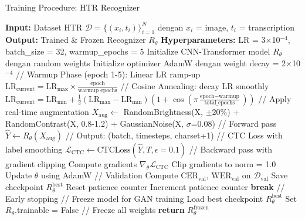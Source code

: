 \documentclass[12pt,a4paper]{article}
\begin{document}
\begin{algorithm}[H]
\caption{Training Procedure: HTR Recognizer}
\label{alg:recognizer-training}
\small
\begin{algorithmic}[1]
\STATE \textbf{Input:} Dataset HTR $\mathcal{D} = \{(x_i, t_i)\}_{i=1}^N$ dengan $x_i$ = image, $t_i$ = transcription
\STATE \textbf{Output:} Trained \& Frozen Recognizer $R_{\theta}$
\STATE \textbf{Hyperparameters:} LR = 3×10$^{-4}$, batch\_size = 32, warmup\_epochs = 5
\STATE
\STATE Initialize CNN-Transformer model $R_{\theta}$ dengan random weights
\STATE Initialize optimizer AdamW dengan weight decay = 2×10$^{-4}$
\STATE
{}
    \STATE // Warmup Phase (epoch 1-5): Linear LR ramp-up
        \STATE $\text{LR}_{\text{current}} = \text{LR}_{\text{max}} \times \frac{\text{epoch}}{\text{warmup\_epochs}}$
    \ELSE
        \STATE // Cosine Annealing: decay LR smoothly
        \STATE $\text{LR}_{\text{current}} = \text{LR}_{\text{min}} + \frac{1}{2}(\text{LR}_{\text{max}} - \text{LR}_{\text{min}})(1 + \cos(\pi \frac{\text{epoch} - \text{warmup}}{\text{total\_epochs}}))$
    \ENDIF
    \STATE
        \STATE // Apply real-time augmentation
        \STATE $X_{\text{aug}} \gets$ RandomBrightness(X, $\pm$20\%) + RandomContrast(X, 0.8-1.2) + GaussianNoise(X, $\sigma$=0.08)
        \STATE
        \STATE // Forward pass
        \STATE $\hat{Y} \gets R_{\theta}(X_{\text{aug}})$ \quad // Output: (batch, timesteps, charset+1)
        \STATE
        \STATE // CTC Loss with label smoothing
        \STATE $\mathcal{L}_{\text{CTC}} \gets \text{CTCLoss}(\hat{Y}, T, \epsilon=0.1)$
        \STATE
        \STATE // Backward pass with gradient clipping
        \STATE Compute gradients $\nabla_{\theta} \mathcal{L}_{\text{CTC}}$
        \STATE Clip gradients to norm = 1.0
        \STATE Update $\theta$ using AdamW
    \ENDFOR
    \STATE
    \STATE // Validation
    \STATE Compute $\text{CER}_{\text{val}}$, $\text{WER}_{\text{val}}$ on $\mathcal{D}_{\text{val}}$
        \STATE Save checkpoint $R_{\theta}^{\text{best}}$
        \STATE Reset patience counter
    \ELSE
        \STATE Increment patience counter
    \ENDIF
        \STATE \textbf{break} \quad // Early stopping
    \ENDIF
\ENDFOR
\STATE
\STATE // Freeze model for GAN training
\STATE Load best checkpoint $R_{\theta}^{\text{best}}$
\STATE Set $R_{\theta}$.trainable = False \quad // Freeze all weights
\STATE \textbf{return} $R_{\theta}^{\text{frozen}}$
\end{algorithmic}
\end{algorithm}
\end{document}
